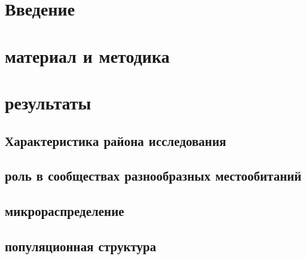 \documentclass[12pt, a4paper]{article}
\begin{document}

\section{Введение}

\section{материал и методика}
		

\section{результаты}
	\subsection{Характеристика района исследования}
		

        \subsection{роль в сообществах разнообразных местообитаний}



        \subsection{микрораспределение}
		
        \subsection{популяционная структура}
		
		
		
		
\end{document}
